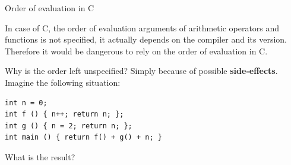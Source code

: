 %
\begin{frame}[fragile]{Order of evaluation in C}

  In case of C, the order of evaluation arguments of arithmetic
  operators and functions is not specified, it actually depends on the
  compiler and its version. Therefore it would be dangerous to rely on
  the order of evaluation in C.

  \bigskip

  Why is the order left unspecified? Simply because of possible
  \textbf{side-effects}. Imagine the following situation:
{\small
\begin{verbatim}
int n = 0;
int f () { n++; return n; };
int g () { n = 2; return n; };
int main () { return f() + g() + n; }
\end{verbatim}
}
What is the result?

\end{frame}

